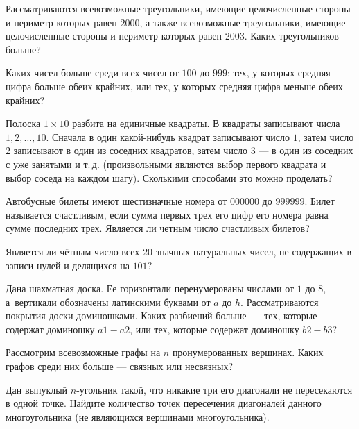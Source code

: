 \resetproblem \begingroup %
    \def\jeolmdate{07 ноября 2018г.}%
    \def\jeolmauthors{}%
\jeolmheader \endgroup


\begin{problems}

\item Рассматриваются всевозможные треугольники, имеющие целочисленные стороны и периметр которых равен $2000$, а также всевозможные треугольники, имеющие целочисленные стороны и периметр которых равен $2003$. Каких треугольников больше? 

\item Каких чисел больше среди всех чисел от $100$ до $999$: тех, у которых средняя цифра больше обеих крайних, или тех, у которых средняя цифра меньше обеих крайних?

\item Полоска $1\times 10$ разбита на единичные квадраты. В квадраты записывают числа $1, 2, \dots, 10$. Сначала в один какой-нибудь квадрат записывают число $1$, затем число $2$ записывают в один из соседних квадратов, затем число $3$ --- в один из соседних с уже занятыми и т.\,д. (произвольными являются выбор первого квадрата и выбор соседа на каждом шагу). Сколькими способами это можно проделать?

\item \subproblem Автобусные билеты имеют шестизначные номера от $000000$ до $999999$. Билет называется счастливым, если сумма первых трех его цифр его номера равна сумме последних трех. Является ли четным число счастливых билетов?

\subproblem Является ли чётным число всех $20$-значных натуральных чисел, не содержащих в записи нулей и делящихся на $101$?

\item Дана шахматная доска. Ее горизонтали перенумерованы числами от $1$ до $8$, а~вертикали обозначены латинскими буквами от $a$ до $h$. Рассматриваются покрытия доски доминошками. Каких разбиений больше~--- тех, которые содержат доминошку $a1-a2$, или тех, которые содержат доминошку $b2-b3$?

\item Рассмотрим всевозможные графы на $n$ пронумерованных вершинах. Каких графов среди них больше --- связных или несвязных?

\item Дан выпуклый $n$-угольник такой, что никакие три его диагонали не пересекаются в одной точке. Найдите количество точек пересечения диагоналей данного многоугольника (не являющихся вершинами многоугольника).



\end{problems}

